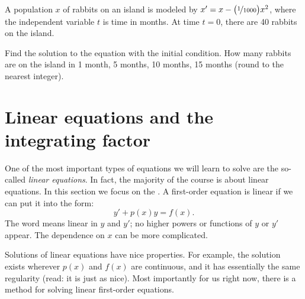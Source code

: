 \begin{exercise}
A population $x$ of rabbits on an island is modeled by
$x' = x- \bigl(\nicefrac{1}{1000} \bigr) x^2$, where the independent
variable $t$ is time in months.  At time $t=0$, there are 40 rabbits
on the island.
\begin{tasks}
\task Find the solution to the equation with the initial
condition.
\task
How many rabbits are on the island in 1 month, 5 months, 
10 months, 15 months (round to the nearest integer).
\end{tasks}
\end{exercise}


\sectionnewpage
\section{Linear equations and the integrating factor}
\label{intfactor:section}



One of the most important types of equations we will learn to solve are
the so-called
\emph{linear equations}.
In fact, the majority of the course is about linear
equations.  In this section we focus on the
\emph{}.
A first-order equation is linear if we can put it
into the form:
\begin{equation} \label{lineq:eq1}
y' + p(x) y = f(x) .
\end{equation}
The word
 means linear in $y$ and $y'$;
no higher powers or functions of $y$ or $y'$ appear.
The dependence on $x$ can be more
complicated.

Solutions of linear equations have nice properties.  For example, the
solution exists wherever $p(x)$ and $f(x)$ are continuous,
and it has essentially the same
regularity (read: it is just as nice).  Most importantly for us right now,
there is a method for solving linear first-order equations.


